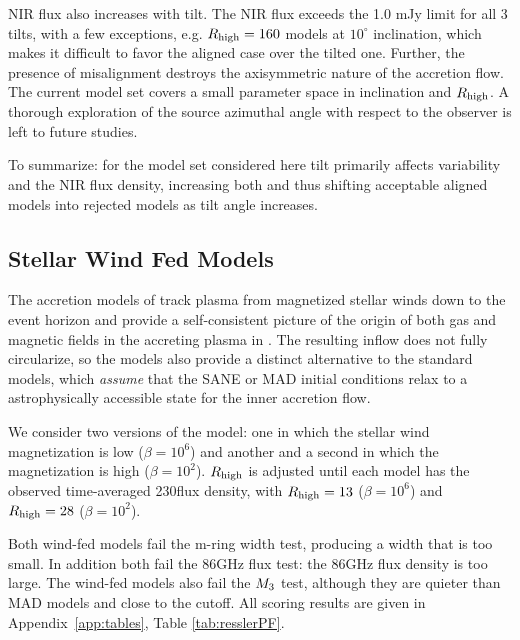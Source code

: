 
NIR flux also increases with tilt.  The NIR flux exceeds the 1.0 mJy limit for all 3 tilts, with a few exceptions, e.g. $R_{\rm high}=160$ models at $10^{\circ}$ inclination, which makes it difficult to favor the aligned case over the tilted one. Further, the presence of misalignment destroys the axisymmetric nature of the accretion flow.  The current model set covers a small parameter space in inclination and $R_{\rm high}$.  A thorough exploration of the source azimuthal angle with respect to the observer is left to future studies.

To summarize: for the model set considered here tilt primarily affects variability and the NIR flux density, increasing both and thus shifting acceptable aligned models into rejected models as tilt angle increases.

\subsection{Stellar Wind Fed Models}

The accretion models of \cite{2020ApJ...896L...6R, 2020MNRAS.492.3272R, 2018MNRAS.478.3544R} track plasma from  magnetized stellar winds down to the event horizon and provide a self-consistent picture of the origin of both gas and magnetic fields in the accreting plasma in \sgra.  The resulting inflow does not fully circularize, so the models also provide a distinct alternative to the standard models, which {\em assume} that the SANE or MAD initial conditions relax to a astrophysically accessible state for the inner accretion flow.

We consider two versions of the model: one in which the stellar wind magnetization is low ($\beta = 10^6$) and another and a second in which the magnetization is high ($\beta = 10^2$). $R_\mathrm{high}$ is adjusted until each model has the observed time-averaged 230\GHz flux density, with $R_\mathrm{high} = 13$ ($\beta = 10^6$) and $R_\mathrm{high} = 28$ ($\beta = 10^2$).

Both wind-fed models fail the m-ring width test, producing a width that is too small.  In addition both fail the 86GHz flux test: the 86GHz flux density is too large.  The wind-fed models also fail the $M_{3}$ test, although they are quieter than MAD models and close to the cutoff.   All scoring results are given in Appendix~\ref{app:tables}, Table \ref{tab:resslerPF}.

